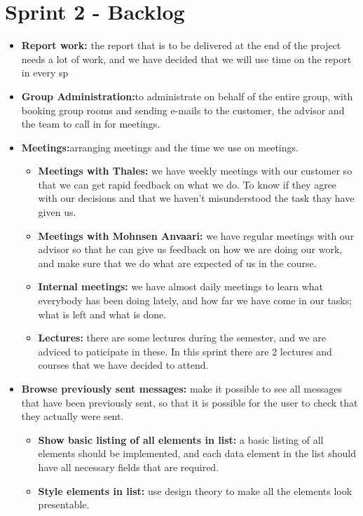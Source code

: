 \section{Sprint 2 - Backlog}

\begin{itemize}
\item{}\textbf{Report work:} the report that is to be delivered at the end of the project needs a lot of work, and we have decided that we will use time on the report in every sp
\item{}\textbf{Group Administration:}to administrate on behalf of the entire group, with booking group rooms and sending e-mails to the customer, the advisor and the team to call in for meetings.
\item{}\textbf{Meetings:}arranging meetings and the time we use on meetings.
\begin{itemize}
\item{}\textbf{Meetings with Thales:} we have weekly meetings with our customer so that we can get rapid feedback on what we do. To know if they agree with our decisions and that we haven't misunderstood the task thay have given us.
\item{}\textbf{Meetings with Mohnsen Anvaari:} we have regular meetings with our advisor so that he can give us feedback on how we are doing our work, and make sure that we do what are expected of us in the course.
\item{}\textbf{Internal meetings:} we have almost daily meetings to learn what everybody has been doing lately, and how far we have come in our tasks; what is left and what is done.
\item{}\textbf{Lectures:} there are some lectures during the semester, and we are adviced to paticipate in these. In this sprint there are 2 lectures and courses that we have decided to attend.
\end{itemize}
\item{}\textbf{Browse previously sent messages:} make it possible to see all messages that have been previously sent, so that it is possible for the user to check that they actually were sent.
\begin{itemize}
\item{}\textbf{Show basic listing of all elements in list:} a basic listing of all elements should be implemented, and each data element in the list should have all necessary fields that are required.
\item{}\textbf{Style elements in list:} use design theory to make all the elements look presentable.

\end{itemize}
\end{itemize}
